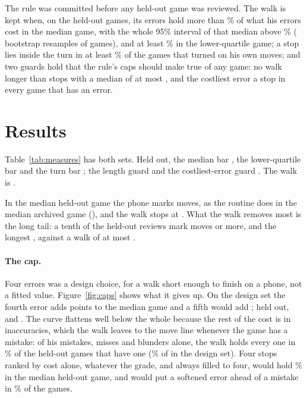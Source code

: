 \documentclass[11pt]{article}
\begin{document}
The rule was committed before any held-out game was reviewed. The walk is kept when, on the
held-out games, its errors hold more than \MedianAbove\% of what his errors cost in the median
game, with the whole 95\% interval of that median above \MedianAbove\% (\Draws{} bootstrap
resamples of games), and at least \QuartileBar\% in the lower-quartile game; a stop lies inside
the turn in at least \TurnBar\% of the games that turned on his own moves; and two guards hold
that the rule's caps should make true of any game: no walk longer than \LongWalk{} stops with a
median of at most \MaxErrors, and the costliest error a stop in every game that has an error.

\section{Results}

\MeasureTable

Table~\ref{tab:measures} has both sets. Held out, the median bar \CheckMedian, the
lower-quartile bar \CheckQuartile{} and the turn bar \CheckTurn; the length guard \CheckLength{}
and the costliest-error guard \CheckSeen. The walk is \Kept.

In the median held-out game the phone marks \HeldMomentsMedian{} moves, as the routine does in
the median archived game (\DesignMomentsMedian), and the walk stops at \HeldStopsMedian. What the
walk removes most is the long tail: a tenth of the held-out reviews mark \HeldMomentsNinety{}
moves or more, and the longest \HeldMomentsMost, against a walk of at most \HeldStopsMost.

\CapFigure

\paragraph{The cap.} Four errors was a design choice, for a walk short enough to finish on a
phone, not a fitted value. Figure~\ref{fig:caps} shows what it gives up. On the design set the
fourth error adds \DesignFourthAdds{} points to the median game and a fifth would add
\DesignFifthAdds; held out, \HeldFourthAdds{} and \HeldFifthAdds. The curve flattens well below
the whole because the rest of the cost is in inaccuracies, which the walk leaves to the move
line whenever the game has a mistake: of his mistakes, misses and blunders alone, the walk holds
every one in \HeldSeriousWhole\% of the \HeldSeriousGames{} held-out games that have one
(\DesignSeriousWhole\% of \DesignSeriousGames{} in the design set). Four stops ranked by cost
alone, whatever the grade, and always filled to four, would hold \HeldByCost\% in the median
held-out game, and would put a softened error ahead of a mistake in \HeldSoftened\% of the
games.
\end{document}
